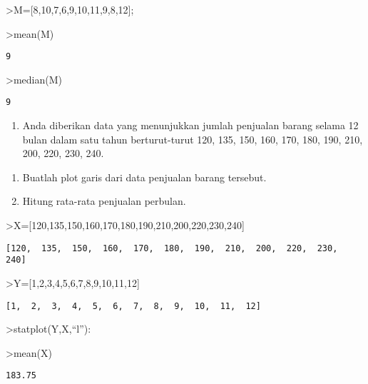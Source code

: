 \documentclass[
]{book}
\providecommand{\tightlist}{%
  \setlength{\itemsep}{0pt}\setlength{\parskip}{0pt}}
\begin{document}
\textgreater M={[}8,10,7,6,9,10,11,9,8,12{]};

\textgreater mean(M)

\begin{verbatim}
9
\end{verbatim}

\textgreater median(M)

\begin{verbatim}
9
\end{verbatim}

\begin{enumerate}
\def\labelenumi{\arabic{enumi}.}
\setcounter{enumi}{6}
\tightlist
\item
  Anda diberikan data yang menunjukkan jumlah penjualan barang selama 12 bulan dalam satu tahun berturut-turut 120, 135, 150, 160, 170, 180, 190, 210, 200, 220, 230, 240.
\end{enumerate}

\begin{enumerate}
\def\labelenumi{\alph{enumi})}
\item
  Buatlah plot garis dari data penjualan barang tersebut.
\item
  Hitung rata-rata penjualan perbulan.
\end{enumerate}

\textgreater X={[}120,135,150,160,170,180,190,210,200,220,230,240{]}

\begin{verbatim}
[120,  135,  150,  160,  170,  180,  190,  210,  200,  220,  230,  240]
\end{verbatim}

\textgreater Y={[}1,2,3,4,5,6,7,8,9,10,11,12{]}

\begin{verbatim}
[1,  2,  3,  4,  5,  6,  7,  8,  9,  10,  11,  12]
\end{verbatim}

\textgreater statplot(Y,X,``l''):

\textgreater mean(X)

\begin{verbatim}
183.75
\end{verbatim}

\backmatter
\end{document}
